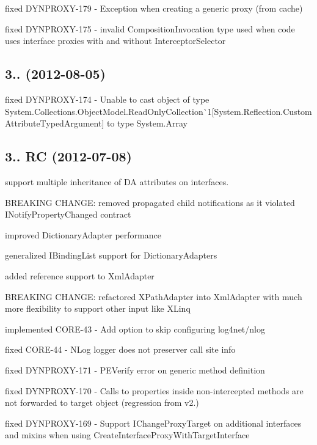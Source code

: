 \begin{DoxyItemize}
\item fixed D\+Y\+N\+P\+R\+O\+X\+Y-\/179 -\/ Exception when creating a generic proxy (from cache)
\item fixed D\+Y\+N\+P\+R\+O\+X\+Y-\/175 -\/ invalid Composition\+Invocation type used when code uses interface proxies with and without Interceptor\+Selector
\end{DoxyItemize}

\subsection*{3.. (2012-\/08-\/05)}


\begin{DoxyItemize}
\item fixed D\+Y\+N\+P\+R\+O\+X\+Y-\/174 -\/ Unable to cast object of type \textquotesingle{}System.\+Collections.\+Object\+Model.\+Read\+Only\+Collection\`{}1\mbox{[}System.\+Reflection.\+Custom\+Attribute\+Typed\+Argument\mbox{]}\textquotesingle{} to type \textquotesingle{}System.\+Array\textquotesingle{}
\end{DoxyItemize}

\subsection*{3.. RC (2012-\/07-\/08)}


\begin{DoxyItemize}
\item support multiple inheritance of DA attributes on interfaces.
\item B\+R\+E\+A\+K\+I\+NG C\+H\+A\+N\+GE\+: removed propagated child notifications as it violated I\+Notify\+Property\+Changed contract
\item improved Dictionary\+Adapter performance
\item generalized I\+Binding\+List support for Dictionary\+Adapters
\item added reference support to Xml\+Adapter
\item B\+R\+E\+A\+K\+I\+NG C\+H\+A\+N\+GE\+: refactored X\+Path\+Adapter into Xml\+Adapter with much more flexibility to support other input like X\+Linq
\item implemented C\+O\+R\+E-\/43 -\/ Add option to skip configuring log4net/nlog
\item fixed C\+O\+R\+E-\/44 -\/ N\+Log logger does not preserver call site info
\item fixed D\+Y\+N\+P\+R\+O\+X\+Y-\/171 -\/ P\+E\+Verify error on generic method definition
\item fixed D\+Y\+N\+P\+R\+O\+X\+Y-\/170 -\/ Calls to properties inside non-\/intercepted methods are not forwarded to target object (regression from v2.)
\item fixed D\+Y\+N\+P\+R\+O\+X\+Y-\/169 -\/ Support I\+Change\+Proxy\+Target on additional interfaces and mixins when using Create\+Interface\+Proxy\+With\+Target\+Interface
\end{DoxyItemize}

